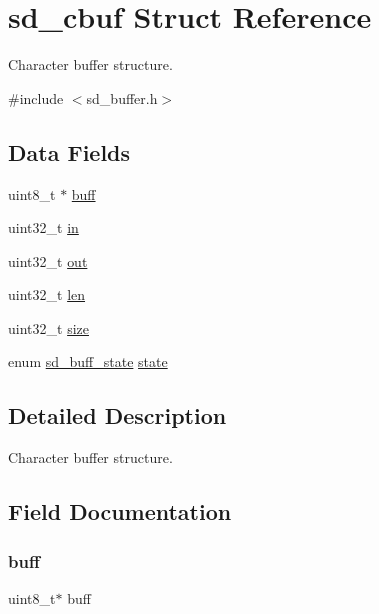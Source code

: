 \hypertarget{structsd__cbuf}{}\section{sd\+\_\+cbuf Struct Reference}
\label{structsd__cbuf}


Character buffer structure.  




{\ttfamily \#include $<$sd\+\_\+buffer.\+h$>$}

\subsection*{Data Fields}
\begin{DoxyCompactItemize}
\item 
uint8\+\_\+t $\ast$ \mbox{\hyperlink{structsd__cbuf_a8b212742c92a124f2eb4a244acc19f7c}{buff}}
\item 
uint32\+\_\+t \mbox{\hyperlink{structsd__cbuf_a86fd6c417fa43c58339f7cde29495419}{in}}
\item 
uint32\+\_\+t \mbox{\hyperlink{structsd__cbuf_ab27775f0ed2b042b439a7431fbe311eb}{out}}
\item 
uint32\+\_\+t \mbox{\hyperlink{structsd__cbuf_a96bbf959016e4411c9e6b9812a8be60a}{len}}
\item 
uint32\+\_\+t \mbox{\hyperlink{structsd__cbuf_ab2c6b258f02add8fdf4cfc7c371dd772}{size}}
\item 
enum \mbox{\hyperlink{group___s_d___buffer___types_ga52f14e9c7b7d9ba092e1cd615559012b}{sd\+\_\+buff\+\_\+state}} \mbox{\hyperlink{structsd__cbuf_aa88ff4ca3b7aaba9e9aaa27fd9ea94a9}{state}}
\end{DoxyCompactItemize}


\subsection{Detailed Description}
Character buffer structure. 

\subsection{Field Documentation}
\mbox{\label{structsd__cbuf_a8b212742c92a124f2eb4a244acc19f7c}} 
\subsubsection{\texorpdfstring{buff}{buff}}
{\footnotesize\ttfamily uint8\+\_\+t$\ast$ buff}

